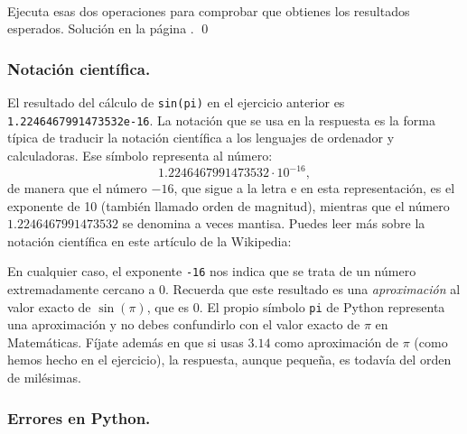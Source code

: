 \documentclass[10pt,a4paper]{article}\usepackage[]{graphicx}\usepackage[]{color}
\begin{document}
\begin{ejercicio}
\label{tut02:ejercicio02}
\quad\\
Ejecuta esas dos operaciones para comprobar que obtienes los resultados esperados.
Solución en la página \pageref{tut02:ejercicio02:sol}.
\qed
\end{ejercicio}


\subsubsection*{Notación científica.}
\label{tut02:subsubsec:notacionCientifica}

El resultado del cálculo de {\tt sin(pi)} en el ejercicio anterior es {\tt 1.2246467991473532e-16}. La notación que se usa en la respuesta es la forma típica de traducir la notación científica a los lenguajes de ordenador y calculadoras. Ese símbolo representa al número:
\[
1.2246467991473532\cdot 10^{−16},
\]
de manera que el número $−16$, que sigue a la letra e en esta representación, es el exponente de 10 (también llamado {\sf orden de magnitud}), mientras que el número $1.2246467991473532$ se denomina a veces {\sf mantisa}. Puedes leer más sobre la notación científica en este artículo de la Wikipedia:
\begin{center}
\end{center}
En cualquier caso, el exponente {\tt -16} nos indica que se trata de un número extremadamente cercano a $0$. Recuerda que este resultado es una {\em aproximación} al valor exacto de $\sin(\pi)$, que es $0$. El propio símbolo {\tt pi} de Python representa una aproximación y no debes confundirlo con el valor exacto de $\pi$ en Matemáticas. Fíjate además en que si usas $3.14$ como aproximación de $\pi$ (como hemos hecho en el ejercicio), la respuesta, aunque pequeña, es todavía del orden de milésimas.

\subsubsection*{Errores en Python.}
\label{tut02:subsubsec:ErroresPython}
\end{document}

